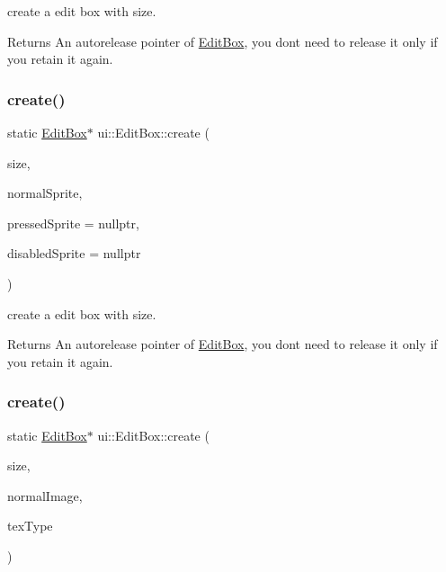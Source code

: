 create a edit box with size. \begin{DoxyReturn}{Returns}
An autorelease pointer of \hyperlink{classui_1_1EditBox}{Edit\+Box}, you don\textquotesingle{}t need to release it only if you retain it again. 
\end{DoxyReturn}
\mbox{\label{classui_1_1EditBox_a49123784600ab9e7913688fc199ca5b1}} 
\subsubsection{\texorpdfstring{create()}{create()}\hspace{0.1cm}{\footnotesize\ttfamily [3/5]}}
{\footnotesize\ttfamily static \hyperlink{classui_1_1EditBox}{Edit\+Box}$\ast$ ui\+::\+Edit\+Box\+::create (\begin{DoxyParamCaption}\item[{const \hyperlink{classSize}{Size} \&}]{size,  }\item[{\hyperlink{classui_1_1Scale9Sprite}{Scale9\+Sprite} $\ast$}]{normal\+Sprite,  }\item[{\hyperlink{classui_1_1Scale9Sprite}{Scale9\+Sprite} $\ast$}]{pressed\+Sprite = {\ttfamily nullptr},  }\item[{\hyperlink{classui_1_1Scale9Sprite}{Scale9\+Sprite} $\ast$}]{disabled\+Sprite = {\ttfamily nullptr} }\end{DoxyParamCaption})\hspace{0.3cm}{\ttfamily [static]}}

create a edit box with size. \begin{DoxyReturn}{Returns}
An autorelease pointer of \hyperlink{classui_1_1EditBox}{Edit\+Box}, you don\textquotesingle{}t need to release it only if you retain it again. 
\end{DoxyReturn}
\mbox{\label{classui_1_1EditBox_ab798f4ef40435304ae46ca44881f7f10}} 
\subsubsection{\texorpdfstring{create()}{create()}\hspace{0.1cm}{\footnotesize\ttfamily [4/5]}}
{\footnotesize\ttfamily static \hyperlink{classui_1_1EditBox}{Edit\+Box}$\ast$ ui\+::\+Edit\+Box\+::create (\begin{DoxyParamCaption}\item[{const \hyperlink{classSize}{Size} \&}]{size,  }\item[{const std\+::string \&}]{normal\+Image,  }\item[{\hyperlink{classui_1_1Widget_a040a65ec5ad3b11119b7e16b98bd9af0}{Texture\+Res\+Type}}]{tex\+Type }\end{DoxyParamCaption})\hspace{0.3cm}{\ttfamily [static]}}

